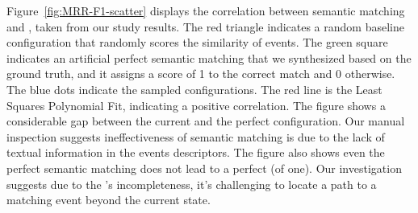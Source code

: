 \smallskip 
Figure~\ref{fig:MRR-F1-scatter} displays the correlation between semantic matching and \testreuse, taken from our study results.
The red triangle indicates a random baseline configuration that randomly scores the similarity of events.
The green square indicates an artificial perfect semantic matching that we synthesized based on the ground truth, and it  assigns a score of 1 to the correct match and 0 otherwise.
The blue dots indicate the sampled configurations.
The red line is 
the Least Squares Polynomial Fit, indicating a positive correlation.
The figure shows a considerable gap between the current \smconfigs and the perfect configuration. 
Our manual inspection suggests ineffectiveness of semantic matching is due to the lack of textual information in the events descriptors.
The figure also shows even the perfect semantic matching does not lead to a perfect \testreuse (\fscore of one).
Our investigation suggests due to the \tam's incompleteness, it's challenging to locate a path to a matching event beyond the current state.



